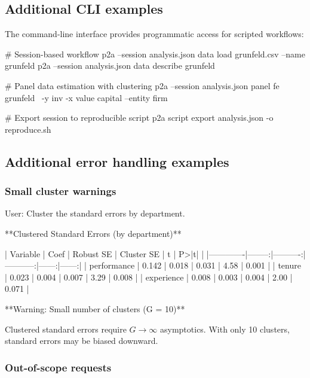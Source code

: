\subsection{Additional CLI examples}

The command-line interface provides programmatic access for scripted workflows:

\begin{Sinput}
# Session-based workflow
p2a --session analysis.json data load grunfeld.csv --name grunfeld
p2a --session analysis.json data describe grunfeld

# Panel data estimation with clustering
p2a --session analysis.json panel fe grunfeld \
    -y inv -x value capital --entity firm

# Export session to reproducible script
p2a script export analysis.json -o reproduce.sh
\end{Sinput}


\subsection{Additional error handling examples}

\subsubsection{Small cluster warnings}

\begin{Sinput}
User: Cluster the standard errors by department.
\end{Sinput}

\begin{Soutput}
**Clustered Standard Errors (by department)**

| Variable    |    Coef | Robust SE | Cluster SE |     t | P>|t| |
|-------------|--------:|----------:|-----------:|------:|------:|
| performance |   0.142 |     0.018 |      0.031 |  4.58 | 0.001 |
| tenure      |   0.023 |     0.004 |      0.007 |  3.29 | 0.008 |
| experience  |   0.008 |     0.003 |      0.004 |  2.00 | 0.071 |

**Warning: Small number of clusters (G = 10)**

Clustered standard errors require $G \to \infty$ asymptotics. With only
10 clusters, standard errors may be biased downward.
\end{Soutput}

\subsubsection{Out-of-scope requests}

